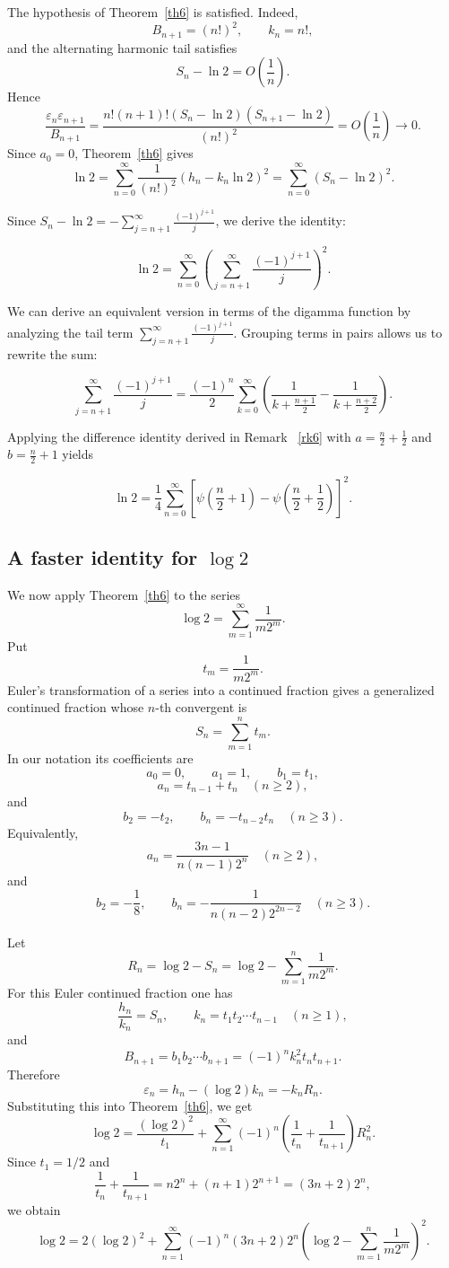 \documentclass[]{interact}
\theoremstyle{plain}
\numberwithin{equation}{section} %
\numberwithin{table}{section} %
\numberwithin{figure}{section}
\begin{document}
The hypothesis of Theorem~\ref{th6} is satisfied. Indeed,
\[
B_{n+1}=(n!)^2,\qquad k_n=n!,
\]
and the alternating harmonic tail satisfies
\[
S_n-\ln 2=O\left(\frac1n\right).
\]
Hence
\[
\frac{\varepsilon_n\varepsilon_{n+1}}{B_{n+1}}
=
\frac{n!(n+1)!(S_n-\ln2)(S_{n+1}-\ln2)}{(n!)^2}
=
O\left(\frac1n\right)\to0.
\]
Since \(a_0=0\), Theorem~\ref{th6} gives
\[
\ln 2
=
\sum_{n=0}^\infty \frac{1}{(n!)^2}(h_n-k_n\ln2)^2
=
\sum_{n=0}^\infty (S_n-\ln2)^2.
\]


Since $S_n - \ln 2 = -\sum_{j=n+1}^\infty \frac{(-1)^{j+1}}{j}$, we derive the identity:

$$\ln 2 = \sum_{n=0}^\infty \left( \sum_{j=n+1}^\infty \frac{(-1)^{j+1}}{j} \right)^2.$$



We can derive an equivalent version in terms of the digamma function by analyzing the tail term $\sum_{j=n+1}^\infty \frac{(-1)^{j+1}}{j}$. Grouping terms in pairs allows us to rewrite the sum:


$$\sum_{j=n+1}^\infty \frac{(-1)^{j+1}}{j} =\frac{(-1)^n}{2} \sum_{k=0}^\infty \left( \frac{1}{k + \frac{n+1}{2}} - \frac{1}{k + \frac{n+2}{2}} \right).$$

Applying the difference identity derived in Remark ~\ref{rk6} with $a = \frac{n}{2} + \frac{1}{2}$ and $b = \frac{n}{2} + 1$ yields


$$\ln 2 = \frac{1}{4} \sum_{n=0}^\infty \left[ \psi\left(\frac{n}{2} + 1\right) - \psi\left(\frac{n}{2} + \frac{1}{2}\right) \right]^2.$$

\subsection{A faster identity for \texorpdfstring{\(\log 2\)}{log 2}}

We now apply Theorem~\ref{th6} to the series
\[
\log 2=\sum_{m=1}^{\infty}\frac{1}{m2^m}.
\]
Put
\[
t_m=\frac{1}{m2^m}.
\]
Euler's transformation of a series into a continued fraction gives a generalized
continued fraction whose \(n\)-th convergent is
\[
S_n=\sum_{m=1}^{n}t_m.
\]
In our notation its coefficients are
\[
a_0=0,\qquad a_1=1,\qquad b_1=t_1,
\]
\[
a_n=t_{n-1}+t_n\quad(n\ge2),
\]
and
\[
b_2=-t_2,\qquad b_n=-t_{n-2}t_n\quad(n\ge3).
\]
Equivalently,
\[
a_n=\frac{3n-1}{n(n-1)2^n}\quad(n\ge2),
\]
and
\[
b_2=-\frac18,\qquad
b_n=-\frac{1}{n(n-2)2^{2n-2}}\quad(n\ge3).
\]

Let
\[
R_n=\log2-S_n
=
\log2-\sum_{m=1}^{n}\frac{1}{m2^m}.
\]
For this Euler continued fraction one has
\[
\frac{h_n}{k_n}=S_n,
\qquad
k_n=t_1t_2\cdots t_{n-1}\quad(n\ge1),
\]
and
\[
B_{n+1}=b_1b_2\cdots b_{n+1}
=
(-1)^n k_n^2t_nt_{n+1}.
\]
Therefore
\[
\varepsilon_n=h_n-(\log2)k_n
=
-k_nR_n.
\]
Substituting this into Theorem~\ref{th6}, we get
\[
\log2
=
\frac{(\log2)^2}{t_1}
+
\sum_{n=1}^{\infty}
(-1)^n
\left(
\frac1{t_n}+\frac1{t_{n+1}}
\right)
R_n^2.
\]
Since \(t_1=1/2\) and
\[
\frac1{t_n}+\frac1{t_{n+1}}
=
n2^n+(n+1)2^{n+1}
=
(3n+2)2^n,
\]
we obtain
\[
\log2
=
2(\log2)^2
+
\sum_{n=1}^{\infty}
(-1)^n(3n+2)2^n
\left(
\log2-\sum_{m=1}^{n}\frac1{m2^m}
\right)^2.
\]
\end{document}
